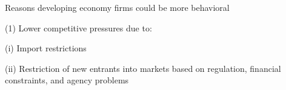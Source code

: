 \documentclass[aspectratio=169, 10pt, handout]{beamer}
\newenvironment{wideitemize}{\itemize\addtolength{\itemsep}{10pt}}{\enditemize}
\begin{document}
\begin{frame}{Reasons developing economy firms could be more behavioral}

\begin{wideitemize}

	\item[(1)] Lower competitive pressures due to:

	\begin{wideitemize}
	
    \smallskip

		\item[(i)] Import restrictions

		\item[(ii)] Restriction of new entrants into markets based on regulation, financial constraints, and agency problems

	\end{wideitemize}

\end{wideitemize}

\end{frame}
\end{document}
